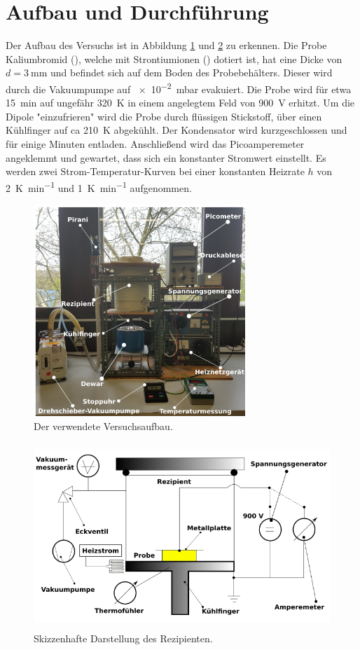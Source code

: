 \newpage
\section{Aufbau und Durchführung}
\label{sec:Durchführung}
Der Aufbau des Versuchs ist in Abbildung \ref{fig:Versuch} und \ref{fig:Versuch2} zu erkennen.
Die Probe Kaliumbromid (), welche mit Strontiumionen () dotiert ist, hat eine Dicke von $d=\SI{3}{\milli\meter}$ und befindet sich auf dem Boden des Probebehälters.
Dieser wird durch die Vakuumpumpe auf \SI{e-2}{\milli\bar} evakuiert.
Die Probe wird für etwa \SI{15}{\minute} auf ungefähr \SI{320}{\kelvin} in einem angelegtem Feld von \SI{900}{\volt} erhitzt.
Um die Dipole "einzufrieren" wird die Probe durch flüssigen Stickstoff, über einen Kühlfinger auf ca \SI{210}{\kelvin} abgekühlt.
Der Kondensator wird kurzgeschlossen und für einige Minuten entladen.
Anschließend wird das Picoamperemeter angeklemmt und gewartet, dass sich ein konstanter Stromwert einstellt.
Es werden zwei Strom-Temperatur-Kurven bei einer konstanten Heizrate $h$ von \SI{2}{\kelvin\per\minute} und \SI{1}{\kelvin\per\minute} aufgenommen.
\begin{figure}[htb]
    \centering
    \includegraphics[height=8cm]{pics/Versuch.png}
    \caption{Der verwendete Versuchsaufbau. \cite{anleitung2}}
    \label{fig:Versuch}
  \end{figure}
  \FloatBarrier
  \begin{figure}[htb]
    \centering
    \includegraphics[height=7cm]{pics/Versuch2.png}
    \caption{Skizzenhafte Darstellung des Rezipienten. \cite{anleitung2}}
    \label{fig:Versuch2}
  \end{figure}
  \FloatBarrier